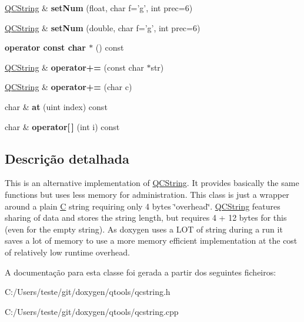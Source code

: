 \begin{DoxyCompactItemize}
\item 
\hypertarget{class_q_c_string_a4297965138032a9ef266a1565514313c}{\hyperlink{class_q_c_string}{Q\-C\-String} \& {\bfseries set\-Num} (float, char f='g', int prec=6)}\label{class_q_c_string_a4297965138032a9ef266a1565514313c}

\item 
\hypertarget{class_q_c_string_a15c2915cb5f62ec50a0a0207064bbcf6}{\hyperlink{class_q_c_string}{Q\-C\-String} \& {\bfseries set\-Num} (double, char f='g', int prec=6)}\label{class_q_c_string_a15c2915cb5f62ec50a0a0207064bbcf6}

\item 
\hypertarget{class_q_c_string_abdd0820f8401e11e09a1e92ab7f4d864}{{\bfseries operator const char $\ast$} () const }\label{class_q_c_string_abdd0820f8401e11e09a1e92ab7f4d864}

\item 
\hypertarget{class_q_c_string_a93ee8fcf710e6af092b2fe34834c6b9b}{\hyperlink{class_q_c_string}{Q\-C\-String} \& {\bfseries operator+=} (const char $\ast$str)}\label{class_q_c_string_a93ee8fcf710e6af092b2fe34834c6b9b}

\item 
\hypertarget{class_q_c_string_a67bb76735cbba9359886e7c6a2f5e29b}{\hyperlink{class_q_c_string}{Q\-C\-String} \& {\bfseries operator+=} (char c)}\label{class_q_c_string_a67bb76735cbba9359886e7c6a2f5e29b}

\item 
\hypertarget{class_q_c_string_a6e0620792d6df1c9d4c2de6fcc43d96f}{char \& {\bfseries at} (uint index) const }\label{class_q_c_string_a6e0620792d6df1c9d4c2de6fcc43d96f}

\item 
\hypertarget{class_q_c_string_aa26690d818962b4f4043781f42d6b350}{char \& {\bfseries operator\mbox{[}$\,$\mbox{]}} (int i) const }\label{class_q_c_string_aa26690d818962b4f4043781f42d6b350}

\end{DoxyCompactItemize}


\subsection{Descrição detalhada}
This is an alternative implementation of \hyperlink{class_q_c_string}{Q\-C\-String}. It provides basically the same functions but uses less memory for administration. This class is just a wrapper around a plain \hyperlink{class_c}{C} string requiring only 4 bytes \char`\"{}overhead\char`\"{}. \hyperlink{class_q_c_string}{Q\-C\-String} features sharing of data and stores the string length, but requires 4 + 12 bytes for this (even for the empty string). As doxygen uses a L\-O\-T of string during a run it saves a lot of memory to use a more memory efficient implementation at the cost of relatively low runtime overhead. 

A documentação para esta classe foi gerada a partir dos seguintes ficheiros\-:\begin{DoxyCompactItemize}
\item 
C\-:/\-Users/teste/git/doxygen/qtools/qcstring.\-h\item 
C\-:/\-Users/teste/git/doxygen/qtools/qcstring.\-cpp\end{DoxyCompactItemize}
